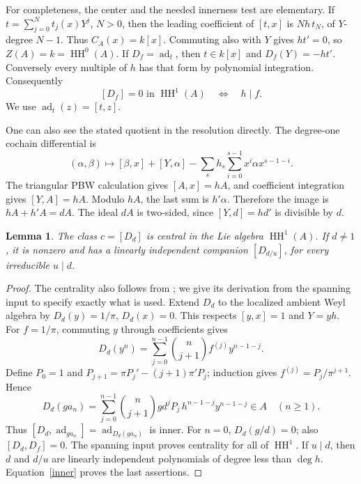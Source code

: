 \documentclass[11pt]{article}
\newtheorem{lemma}[theorem]{Lemma}
\theoremstyle{remark}\newtheorem{remark}[theorem]{Remark}
\newcommand{\HH}{\operatorname{HH}}
\newcommand{\ad}{\operatorname{ad}}
\begin{document}
For completeness, the center and the needed innerness test are elementary.
If \(t=\sum_{j=0}^N t_j(x)Y^j\), \(N>0\), then the leading coefficient
of \([t,x]\) is \(Nh\,t_N\), of \(Y\)-degree \(N-1\).
Thus \(C_A(x)=k[x]\). Commuting also with \(Y\) gives \(ht'=0\), so
\(Z(A)=k=\HH^0(A)\). If \(D_f=\ad_t\), then \(t\in k[x]\) and
\(D_f(Y)=-ht'\). Conversely every multiple of \(h\) has that form by
polynomial integration. Consequently
\begin{equation}\label{inner}
 [D_f]=0\text{ in }\HH^1(A)\quad\Longleftrightarrow\quad h\mid f.
\end{equation}
We use \(\ad_t(z)=[t,z]\).

One can also see the stated quotient in the resolution directly.
The degree-one cochain differential is
\[
 (\alpha,\beta)\longmapsto
 [\beta,x]+[Y,\alpha]-\sum_s h_s\sum_{i=0}^{s-1}x^i\alpha x^{s-1-i}.
\]
The triangular PBW calculation gives \([A,x]=hA\), and coefficient
integration gives \([Y,A]=hA\). Modulo \(hA\), the last sum is
\(h'\alpha\). Therefore the image is \(hA+h'A=dA\).
The ideal \(dA\) is two-sided, since \([Y,d]=hd'\) is divisible by \(d\).

\begin{lemma}\label{central}
The class \(c=[D_d]\) is central in the Lie algebra \(\HH^1(A)\).
If \(d\ne1\), it is nonzero and has a linearly independent companion
\([D_{d/u}]\), for every irreducible \(u\mid d\).
\end{lemma}
\begin{proof}
The centrality also follows from \cite[Theorem~6.2(b)]{LS}; we give its
derivation from the spanning input to specify exactly what is used.
Extend \(D_d\) to the localized ambient Weyl algebra by
\(D_d(y)=1/\pi\), \(D_d(x)=0\). This respects \([y,x]=1\) and \(Y=yh\).
For \(f=1/\pi\), commuting \(y\) through coefficients gives
\[
 D_d(y^n)=\sum_{j=0}^{n-1}\binom{n}{j+1}f^{(j)}y^{n-1-j}.
\]
Define \(P_0=1\) and
\(P_{j+1}=\pi P_j'-(j+1)\pi'P_j\); induction gives
\(f^{(j)}=P_j/\pi^{j+1}\). Hence
\[
 D_d(g a_n)=
 \sum_{j=0}^{n-1}\binom{n}{j+1}
       g d^jP_j\,h^{n-1-j}y^{n-1-j}\in A\quad(n\ge1).
\]
Thus \([D_d,\ad_{g a_n}]=\ad_{D_d(g a_n)}\) is inner.
For \(n=0\), \(D_d(g/d)=0\); also \([D_d,D_f]=0\).
The spanning input proves centrality for all of \(\HH^1\).
If \(u\mid d\), then \(d\) and \(d/u\) are linearly independent
polynomials of degree less than \(\deg h\). Equation~\eqref{inner}
proves the last assertions.
\end{proof}
\end{document}
